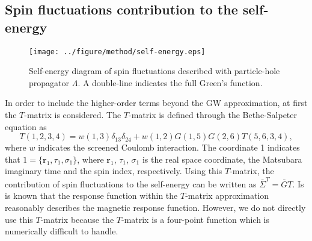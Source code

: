 \subsection{Spin fluctuations contribution to the self-energy}

\begin{figure} %
	\centering
	\texttt{[image: ../figure/method/self-energy.eps]}
	\caption{Self-energy diagram of spin fluctuations described with particle-hole propagator $\Lambda$. A double-line indicates the full Green's function.}
	\label{fig:SF-self}
\end{figure}

In order to include the higher-order terms beyond the GW approximation, at first the $T$-matrix\cite{Gordon1961,Ersoy2010} is considered.
The $T$-matrix is defined through the Bethe-Salpeter equation\cite{BSE1951} as
%
\begin{equation}
	T(1,2,3,4) = w(1,3)\delta_{13}\delta_{24} + 
	w(1,2)G(1,5)G(2,6)T(5,6,3,4),
	\label{eq:T-BSE}
\end{equation}
%
where $w$ indicates the screened Coulomb interaction.
The coordinate 1 indicates that $1=\{\bm r_1, \tau_1, \sigma_1\}$, 
where $\bm r_1$, $\tau_1$, $\sigma_1$ is the real space coordinate,
the Matsubara imaginary time and the spin index, respectively.
Using this $T$-matrix, the contribution of spin fluctuations to the self-energy can be written as $\bar{\Sigma}^{T}=\bar{G}T$.
Is is known that the response function within the $T$-matrix approximation reasonably describes the magnetic response function\cite{Ersoy2010,Onida2002}.
However, we do not directly use this $T$-matrix because the $T$-matrix is a four-point function
which is numerically difficult to handle.

